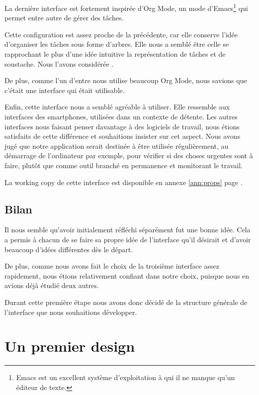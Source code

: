 \documentclass[11pt]{article}
\begin{document}
La dernière interface est fortement inspirée d'Org Mode, un mode
d'Emacs\footnote{Emacs est un excellent système d'exploitation à qui
  il ne manque qu'un éditeur de texte.} qui permet entre autre de
gérer des tâches.

Cette configuration est assez proche de la précédente, car elle
conserve l'idée d'organiser les tâches sous forme d'arbres. Elle nous
a semblé être celle se rapprochant le plus d'une idée intuitive la
représentation de tâches et de \gls{soustache}. Nous l'avons
considérée .

De plus, comme l'un d'entre nous utilise beaucoup Org Mode, nous
savions que c'était une interface qui était utilisable.

Enfin, cette interface nous a semblé agréable à utiliser. Elle
ressemble aux interfaces des smartphones, utilisées dans un contexte
de détente. Les autres interfaces nous faisant penser davantage à des
logiciels de travail, nous étions satisfaits de cette différence et
souhaitions insister sur cet aspect. Nous avons jugé que notre
application serait destinée à être utilisée régulièrement, au
démarrage de l'ordinateur par exemple, pour vérifier si des choses
urgentes sont à faire, plutôt que comme outil branché en permanence et
monitorant le travail.

La working copy de cette interface est disponible en annexe \ref{ann:props} page \pageref{fig:sexy}.


\subsection{Bilan}

Il nous semble qu'avoir initialement réfléchi séparément fut une bonne
idée. Cela a permis à chacun de se faire sa propre idée de l'interface
qu'il désirait et d'avoir beaucoup d'idées différentes dès le départ.

De plus, comme nous avons fait le choix de la troisième interface assez
rapidement, nous étions relativement confiant dans notre choix,
puisque nous en avions déjà étudié deux autres.

Durant cette première étape nous avons donc décidé de la structure
générale de l'interface que nous souhaitions développer.


\section{Un premier design}
\label{sec:premierDesign}
\end{document}
